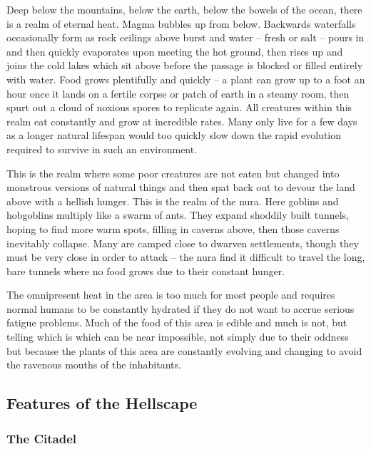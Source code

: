 \begin{multicols}{2}

\noindent
Deep below the mountains, below the earth, below the bowels of the ocean, there is a realm of eternal heat.
Magma bubbles up from below.
Backwards waterfalls occasionally form as rock ceilings above burst and water -- fresh or salt -- pours in and then quickly evaporates upon meeting the hot ground, then rises up and joins the cold lakes which sit above before the passage is blocked or filled entirely with water.
Food grows plentifully and quickly -- a plant can grow up to a foot an hour once it lands on a fertile corpse or patch of earth in a steamy room, then spurt out a cloud of noxious spores to replicate again.
All creatures within this realm eat constantly and grow at incredible rates.
Many only live for a few days as a longer natural lifespan would too quickly slow down the rapid evolution required to survive in such an environment.

	This is the realm where some poor creatures are not eaten but changed into monstrous versions of natural things and then spat back out to devour the land above with a hellish hunger.  This is the realm of the nura.  Here goblins and hobgoblins multiply like a swarm of ants.  They expand shoddily built tunnels, hoping to find more warm spots, filling in caverns above, then those caverns inevitably collapse.  Many are camped close to dwarven settlements, though they must be very close in order to attack -- the nura find it difficult to travel the long, bare tunnels where no food grows due to their constant hunger.

	The omnipresent heat in the area is too much for most people and requires normal humans to be constantly hydrated if they do not want to accrue serious fatigue problems.  Much of the food of this area is edible and much is not, but telling which is which can be near impossible, not simply due to their oddness but because the plants of this area are constantly evolving and changing to avoid the ravenous mouths of the inhabitants.

\subsection{Features of the Hellscape}

\subsubsection{The Citadel}


\end{multicols}
